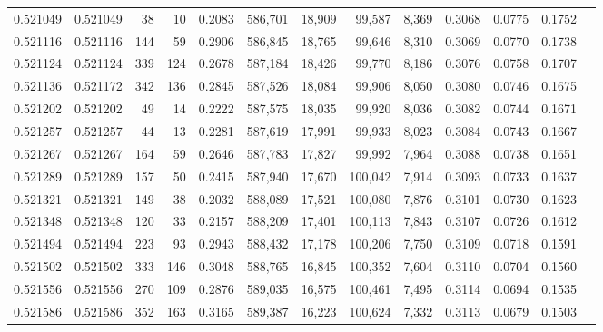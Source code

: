 \begin{tabular}{rrrrrrrrrrrrr}
0.521049 & 0.521049 &    38 &    10 &                                     0.2083 & 586,701 &  18,909 &  99,587 &   8,369 & 0.3068 & 0.0775 & 0.1752 \\
0.521116 & 0.521116 &   144 &    59 &                                     0.2906 & 586,845 &  18,765 &  99,646 &   8,310 & 0.3069 & 0.0770 & 0.1738 \\
0.521124 & 0.521124 &   339 &   124 &                                     0.2678 & 587,184 &  18,426 &  99,770 &   8,186 & 0.3076 & 0.0758 & 0.1707 \\
0.521136 & 0.521172 &   342 &   136 &                                     0.2845 & 587,526 &  18,084 &  99,906 &   8,050 & 0.3080 & 0.0746 & 0.1675 \\
0.521202 & 0.521202 &    49 &    14 &                                     0.2222 & 587,575 &  18,035 &  99,920 &   8,036 & 0.3082 & 0.0744 & 0.1671 \\
0.521257 & 0.521257 &    44 &    13 &                                     0.2281 & 587,619 &  17,991 &  99,933 &   8,023 & 0.3084 & 0.0743 & 0.1667 \\
0.521267 & 0.521267 &   164 &    59 &                                     0.2646 & 587,783 &  17,827 &  99,992 &   7,964 & 0.3088 & 0.0738 & 0.1651 \\
0.521289 & 0.521289 &   157 &    50 &                                     0.2415 & 587,940 &  17,670 & 100,042 &   7,914 & 0.3093 & 0.0733 & 0.1637 \\
0.521321 & 0.521321 &   149 &    38 &                                     0.2032 & 588,089 &  17,521 & 100,080 &   7,876 & 0.3101 & 0.0730 & 0.1623 \\
0.521348 & 0.521348 &   120 &    33 &                                     0.2157 & 588,209 &  17,401 & 100,113 &   7,843 & 0.3107 & 0.0726 & 0.1612 \\
0.521494 & 0.521494 &   223 &    93 &                                     0.2943 & 588,432 &  17,178 & 100,206 &   7,750 & 0.3109 & 0.0718 & 0.1591 \\
0.521502 & 0.521502 &   333 &   146 &                                     0.3048 & 588,765 &  16,845 & 100,352 &   7,604 & 0.3110 & 0.0704 & 0.1560 \\
0.521556 & 0.521556 &   270 &   109 &                                     0.2876 & 589,035 &  16,575 & 100,461 &   7,495 & 0.3114 & 0.0694 & 0.1535 \\
0.521586 & 0.521586 &   352 &   163 &                                     0.3165 & 589,387 &  16,223 & 100,624 &   7,332 & 0.3113 & 0.0679 & 0.1503 \\

\end{tabular}
